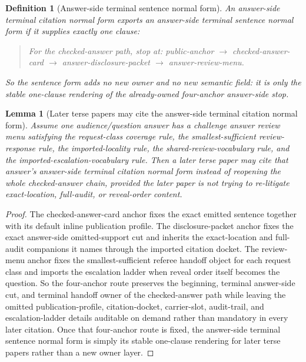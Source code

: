 \documentclass[11pt]{article}
\newtheorem{definition}{Definition}
\newtheorem{lemma}{Lemma}
\begin{document}
\begin{definition}[Answer-side terminal sentence normal form]
An answer-side terminal citation normal form exports an \emph{answer-side terminal sentence normal form} if it supplies exactly one clause:
\begin{quote}\small
For the checked-answer path, stop at: \textsf{public-anchor} $\to$ \textsf{checked-answer-card} $\to$ \textsf{answer-disclosure-packet} $\to$ \textsf{answer-review-menu}.
\end{quote}
So the sentence form adds no new owner and no new semantic field: it is only the stable one-clause rendering of the already-owned four-anchor answer-side stop.
\end{definition}

\begin{lemma}[Later terse papers may cite the answer-side terminal citation normal form]
Assume one audience/question answer has a challenge answer review menu satisfying the request-class coverage rule, the smallest-sufficient review-response rule, the imported-locality rule, the shared-review-vocabulary rule, and the imported-escalation-vocabulary rule.
Then a later terse paper may cite that answer's answer-side terminal citation normal form instead of reopening the whole checked-answer chain, provided the later paper is not trying to re-litigate exact-location, full-audit, or reveal-order content.
\end{lemma}

\begin{proof}
The checked-answer-card anchor fixes the exact emitted sentence together with its default inline publication profile.
The disclosure-packet anchor fixes the exact answer-side omitted-support cut and inherits the exact-location and full-audit companions it names through the imported citation docket.
The review-menu anchor fixes the smallest-sufficient referee handoff object for each request class and imports the escalation ladder when reveal order itself becomes the question.
So the four-anchor route preserves the beginning, terminal answer-side cut, and terminal handoff owner of the checked-answer path while leaving the omitted publication-profile, citation-docket, carrier-slot, audit-trail, and escalation-ladder details auditable on demand rather than mandatory in every later citation. Once that four-anchor route is fixed, the answer-side terminal sentence normal form is simply its stable one-clause rendering for later terse papers rather than a new owner layer.\qedhere
\end{proof}
\end{document}
